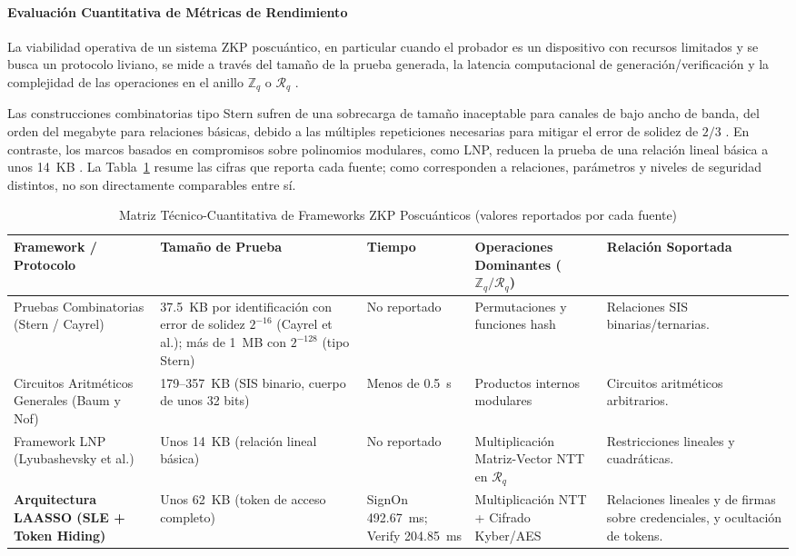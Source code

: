 \paragraph{Evaluación Cuantitativa de Métricas de Rendimiento}
La viabilidad operativa de un sistema ZKP poscuántico, en particular cuando el probador es un dispositivo con recursos limitados y se busca un protocolo liviano, se mide a través del tamaño de la prueba generada, la latencia computacional de generación/verificación y la complejidad de las operaciones en el anillo $\mathbb{Z}_q$ o $\mathcal{R}_q$ \cite{lyubashevsky2022lattice, ma2026laasso}.

Las construcciones combinatorias tipo Stern sufren de una sobrecarga de tamaño inaceptable para canales de bajo ancho de banda, del orden del megabyte para relaciones básicas, debido a las múltiples repeticiones necesarias para mitigar el error de solidez de $2/3$ \cite{cayrel2012improved, lyubashevsky2022lattice}. En contraste, los marcos basados en compromisos sobre polinomios modulares, como LNP, reducen la prueba de una relación lineal básica a unos 14~KB \cite{lyubashevsky2022lattice}. La Tabla~\ref{tab:zkp_metrics_matrix} resume las cifras que reporta cada fuente; como corresponden a relaciones, parámetros y niveles de seguridad distintos, no son directamente comparables entre sí.

\begin{table}[h!]
\centering
\small
\caption{Matriz Técnico-Cuantitativa de Frameworks ZKP Poscuánticos (valores reportados por cada fuente)}
\label{tab:zkp_metrics_matrix}
\begin{tabular}{|p{3.0cm}|p{3.2cm}|p{2.2cm}|p{3.0cm}|p{3.0cm}|}
\hline
\textbf{Framework / Protocolo} & \textbf{Tamaño de Prueba} & \textbf{Tiempo} & \textbf{Operaciones Dominantes ($\mathbb{Z}_q / \mathcal{R}_q$)} & \textbf{Relación Soportada} \\ \hline
Pruebas Combinatorias (Stern / Cayrel) \cite{cayrel2012improved, lyubashevsky2022lattice} & 37.5~KB por identificación con error de solidez $2^{-16}$ (Cayrel et al.); más de 1~MB con $2^{-128}$ (tipo Stern) & No reportado & Permutaciones y funciones hash & Relaciones SIS binarias/ternarias. \\ \hline
Circuitos Aritméticos Generales (Baum y Nof) \cite{baum2020concretely} & 179--357~KB (SIS binario, cuerpo de unos 32 bits) & Menos de 0.5~s & Productos internos modulares & Circuitos aritméticos arbitrarios. \\ \hline
Framework LNP (Lyubashevsky et al.) \cite{lyubashevsky2022lattice} & Unos 14~KB (relación lineal básica) & No reportado & Multiplicación Matriz-Vector NTT en $\mathcal{R}_q$ & Restricciones lineales y cuadráticas. \\ \hline
\textbf{Arquitectura LAASSO (SLE + Token Hiding)} \cite{ma2026laasso} & Unos 62~KB (token de acceso completo) & SignOn 492.67~ms; Verify 204.85~ms & Multiplicación NTT + Cifrado Kyber/AES & Relaciones lineales y de firmas sobre credenciales, y ocultación de tokens. \\ \hline
\end{tabular}
\end{table}

